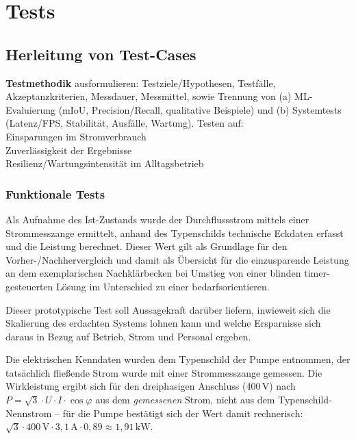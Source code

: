 
\chapter{Tests} \label{Tests}


\section{Herleitung von Test-Cases}
\textbf{Testmethodik} ausformulieren: Testziele/Hypothesen, Testfälle, Akzeptanzkriterien, Messdauer, Messmittel, sowie Trennung von (a) ML-Evaluierung (mIoU, Precision/Recall, qualitative Beispiele) und (b) Systemtests (Latenz/FPS, Stabilität, Ausfälle, Wartung).
Testen auf: \\
Einsparungen im Stromverbrauch \\
Zuverlässigkeit der Ergebnisse \\
Resilienz/Wartungsintensität im Alltagsbetrieb \\


\subsection{Funktionale Tests}

Als Aufnahme des Ist-Zustands wurde der Durchflussstrom mittels einer Strommesszange ermittelt, anhand des Typenschilds technische Eckdaten erfasst und die Leistung berechnet. Dieser Wert gilt als Grundlage für den Vorher-/Nachhervergleich und damit als Übersicht für die einzusparende Leistung an dem exemplarischen Nachklärbecken bei Umstieg von einer blinden timer-gesteuerten Lösung im Unterschied zu einer bedarfsorientieren.

Dieser prototypische Test soll Aussagekraft darüber liefern, inwieweit sich die Skalierung des erdachten Systems lohnen kann und welche Ersparnisse sich daraus in Bezug auf Betrieb, Strom und Personal ergeben.

Die elektrischen Kenndaten wurden dem Typenschild der Pumpe entnommen, der tatsächlich fließende Strom wurde mit einer Strommesszange gemessen. Die Wirkleistung ergibt sich für den dreiphasigen Anschluss (400\,V) nach $P=\sqrt{3}\cdot U \cdot I \cdot \cos\varphi$ aus dem \emph{gemessenen} Strom, nicht aus dem Typenschild-Nennstrom -- für die Pumpe bestätigt sich der Wert damit rechnerisch: $\sqrt{3}\cdot400\,\text{V}\cdot3,1\,\text{A}\cdot0,89 \approx 1,91\,\text{kW}$.

